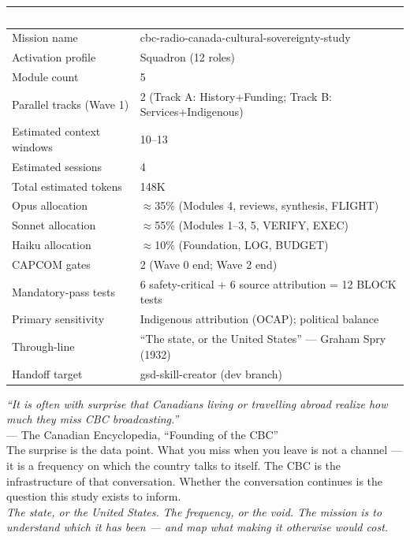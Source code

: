 \documentclass[11pt,letterpaper]{article}
\newcommand{\tableheader}[1]{\textbf{\sffamily\textcolor{white}{#1}}}
\begin{document}
\begin{center}
\begin{tabularx}{\textwidth}{L{4cm}X}
\toprule
{}
\tableheader{Metric} & \tableheader{Value} \\
\midrule
Mission name & cbc-radio-canada-cultural-sovereignty-study \\
Activation profile & Squadron (12 roles) \\
Module count & 5 \\
Parallel tracks (Wave 1) & 2 (Track A: History+Funding; Track B: Services+Indigenous) \\
Estimated context windows & 10--13 \\
Estimated sessions & 4 \\
Total estimated tokens & 148K \\
Opus allocation & $\approx$35\% (Modules 4, reviews, synthesis, FLIGHT) \\
Sonnet allocation & $\approx$55\% (Modules 1--3, 5, VERIFY, EXEC) \\
Haiku allocation & $\approx$10\% (Foundation, LOG, BUDGET) \\
CAPCOM gates & 2 (Wave 0 end; Wave 2 end) \\
Mandatory-pass tests & 6 safety-critical + 6 source attribution = 12 BLOCK tests \\
Primary sensitivity & Indigenous attribution (OCAP); political balance \\
Through-line & ``The state, or the United States'' --- Graham Spry (1932) \\
Handoff target & gsd-skill-creator (dev branch) \\
\bottomrule
\end{tabularx}
\end{center}

\vspace{2em}

\begin{quotebox}
\textit{``It is often with surprise that Canadians living or travelling abroad realize how much they miss CBC broadcasting.''}\\[0.5em]
--- The Canadian Encyclopedia, ``Founding of the CBC''\\[1em]
The surprise is the data point. What you miss when you leave is not a channel --- it is a frequency on which the country talks to itself. The CBC is the infrastructure of that conversation. Whether the conversation continues is the question this study exists to inform.\\[0.5em]
\textit{The state, or the United States. The frequency, or the void. The mission is to understand which it has been --- and map what making it otherwise would cost.}
\end{quotebox}
\end{document}
